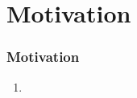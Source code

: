 

\section{Motivation}
\begin{frame}\frametitle{Motivation}
\begin{enumerate}
    \item 
\end{enumerate}

\end{frame}

